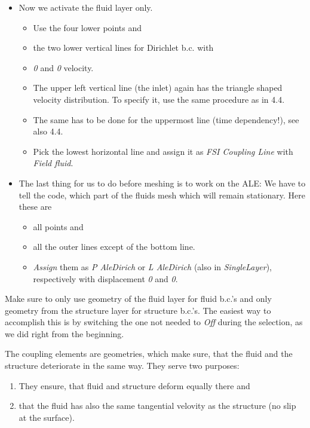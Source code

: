 \begin{itemize}
\item Now we activate the fluid layer only. 

\begin{itemize}
\item Use the four lower points and 
\item the two lower vertical lines for Dirichlet b.c. with 
\item \emph{0} and \emph{0} velocity.
\item The upper left vertical line (the inlet) again has the triangle shaped
velocity distribution. To specify it, use the same procedure as in
4.4.
\item The same has to be done for the uppermost line (time dependency!),
see also 4.4.
\item Pick the lowest horizontal line and assign it as \emph{FSI Coupling
Line} with \emph{Field fluid}.
\end{itemize}
\item The last thing for us to do before meshing is to work on the ALE:
We have to tell the code, which part of the fluids mesh which will
remain stationary. Here these are 

\begin{itemize}
\item all points and 
\item all the outer lines except of the bottom line. 
\item \emph{Assign} them as \emph{P AleDirich} or \emph{L AleDirich} (also
in \emph{SingleLayer}), respectively with displacement \emph{0} and
\emph{0}. 
\end{itemize}
\end{itemize}
Make sure to only use geometry of the fluid layer for fluid b.c.'s
and only geometry from the structure layer for structure b.c.'s. The
easiest way to accomplish this is by switching the one not needed
to \emph{Off} during the selection, as we did right from the beginning. 

The coupling elements are geometries, which make sure, that the fluid
and the structure deteriorate in the same way. They serve two purposes:

\begin{enumerate}
\item They ensure, that fluid and structure deform equally there and
\item that the fluid has also the same tangential velovity as the structure
(no slip at the surface). 
\end{enumerate}

